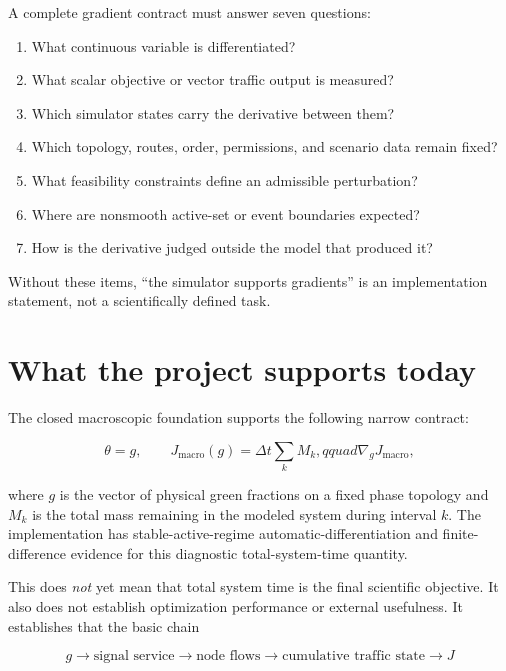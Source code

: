 \documentclass[11pt,a4paper]{article}
\begin{document}
A complete gradient contract must answer seven questions:

\begin{enumerate}
  \item What continuous variable is differentiated?
  \item What scalar objective or vector traffic output is measured?
  \item Which simulator states carry the derivative between them?
  \item Which topology, routes, order, permissions, and scenario data remain fixed?
  \item What feasibility constraints define an admissible perturbation?
  \item Where are nonsmooth active-set or event boundaries expected?
  \item How is the derivative judged outside the model that produced it?
\end{enumerate}

Without these items, ``the simulator supports gradients'' is an implementation statement, not a scientifically defined task.

\section{What the project supports today}

The closed macroscopic foundation supports the following narrow contract:

\begin{equation}
  \theta=g, \qquad
  J_{\mathrm{macro}}(g)=\Delta t\sum_{k}M_k,qquad
  \nabla_gJ_{\mathrm{macro}},
\end{equation}

where $g$ is the vector of physical green fractions on a fixed phase topology and $M_k$ is the total mass remaining in the modeled system during interval $k$. The implementation has stable-active-regime automatic-differentiation and finite-difference evidence for this diagnostic total-system-time quantity.

This does \emph{not} yet mean that total system time is the final scientific objective. It also does not establish optimization performance or external usefulness. It establishes that the basic chain

\begin{equation}
g\rightarrow\text{signal service}\rightarrow\text{node flows}
\rightarrow\text{cumulative traffic state}\rightarrow J
\end{equation}
\end{document}
